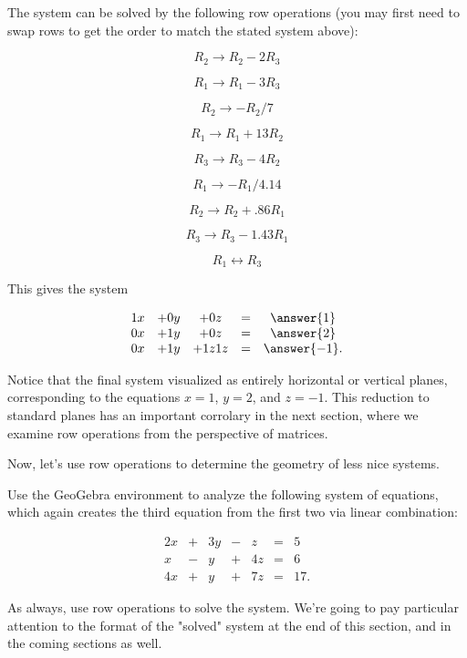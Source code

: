 \documentclass{ximera}
\begin{document}
        \begin{solution}

            The system can be solved by the following row operations (you may first need to swap rows to get the order to match the stated system above):


            $$R_2\rightarrow R_2-2R_3$$

            $$R_1\rightarrow R_1-3R_3$$

            $$R_2\rightarrow -R_2/7$$

            $$R_1\rightarrow R_1+13R_2$$

            $$R_3\rightarrow R_3-4R_2$$

            $$R_1\rightarrow -R_1/4.14$$

            $$R_2\rightarrow R_2+.86R_1$$

            $$R_3\rightarrow R_3-1.43R_1$$

            $$R_1\leftrightarrow R_3$$

            This gives the system 

            $$\begin{array}{ccccccc}
                 1x& +0y&+0z &=&\answer{1} \\
                0x&+1y& +0z& =&\answer{2}\\
                0x &+1y &+1z 1z&=&\answer{-1}.
            \end{array}$$

        \end{solution}


    \begin{remark}

        Notice that the final system visualized as entirely horizontal or vertical planes, corresponding to the equations $x=1$, $y=2$, and $z=-1$. This reduction to standard planes has an important corrolary in the next section, where we examine row operations from the perspective of matrices. 

    \end{remark}

    Now, let's use row operations to determine the geometry of less nice systems.

\begin{example}

    Use the GeoGebra environment to analyze the following system of equations, which again creates the third equation from the first two via linear combination:

    $$\begin{array}{ccccccc}
        2x & +&3y&-&z&= &5 \\
        x& -&y&+&4z&=&6\\
        4x& +&y&+&7z&=&17.
    \end{array}$$

    As always, use row operations to solve the system. We're going to pay particular attention to the format of the "solved" system at the end of this section, and in the coming sections as well.
    \end{example}
\end{document}
